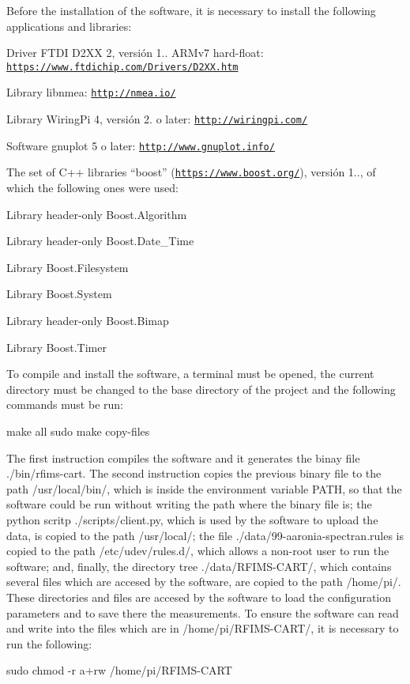 Before the installation of the software, it is necessary to install the following applications and libraries\+:


\begin{DoxyItemize}
\item Driver F\+T\+DI D2\+XX 2, versión 1.. A\+R\+Mv7 hard-\/float\+: \href{https://www.ftdichip.com/Drivers/D2XX.htm}{\tt https\+://www.\+ftdichip.\+com/\+Drivers/\+D2\+X\+X.\+htm}
\item Library libnmea\+: \href{http://nmea.io/}{\tt http\+://nmea.\+io/}
\item Library Wiring\+Pi 4, versión 2. o later\+: \href{http://wiringpi.com/}{\tt http\+://wiringpi.\+com/}
\item Software gnuplot 5 o later\+: \href{http://www.gnuplot.info/}{\tt http\+://www.\+gnuplot.\+info/}
\item The set of C++ libraries “boost” (\href{https://www.boost.org/}{\tt https\+://www.\+boost.\+org/}), versión 1.., of which the following ones were used\+:
\begin{DoxyItemize}
\item Library header-\/only Boost.\+Algorithm
\item Library header-\/only Boost.\+Date\+\_\+\+Time
\item Library Boost.\+Filesystem
\item Library Boost.\+System
\item Library header-\/only Boost.\+Bimap
\item Library Boost.\+Timer
\end{DoxyItemize}
\end{DoxyItemize}

To compile and install the software, a terminal must be opened, the current directory must be changed to the base directory of the project and the following commands must be run\+: \begin{DoxyVerb}make all
sudo make copy-files
\end{DoxyVerb}


The first instruction compiles the software and it generates the binay file ./bin/rfims-\/cart. The second instruction copies the previous binary file to the path /usr/local/bin/, which is inside the environment variable P\+A\+TH, so that the software could be run without writing the path where the binary file is; the python scritp ./scripts/client.py, which is used by the software to upload the data, is copied to the path /usr/local/; the file ./data/99-\/aaronia-\/spectran.rules is copied to the path /etc/udev/rules.d/, which allows a non-\/root user to run the software; and, finally, the directory tree ./data/\+R\+F\+I\+M\+S-\/\+C\+A\+R\+T/, which contains several files which are accesed by the software, are copied to the path /home/pi/. These directories and files are accesed by the software to load the configuration parameters and to save there the measurements. To ensure the software can read and write into the files which are in /home/pi/\+R\+F\+I\+M\+S-\/\+C\+A\+R\+T/, it is necessary to run the following\+: \begin{DoxyVerb}sudo chmod -r a+rw /home/pi/RFIMS-CART
\end{DoxyVerb}


